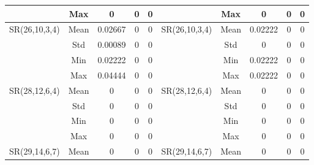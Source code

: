 \documentclass[letterpaper]{article} \usepackage{aaai24}  \usepackage{times}  \usepackage{helvet}  \usepackage{courier}  \usepackage[hyphens]{url}  \usepackage{graphicx} \urlstyle{rm} \def\UrlFont{\rm}  \usepackage{natbib}  \usepackage{caption} \frenchspacing  \setlength{\pdfpagewidth}{8.5in} \setlength{\pdfpageheight}{11in} \usepackage{algorithm}
\begin{document}
\begin{table*}[t]
{\begin{tabular}{@{}ccccc|ccccc@{}}
\multicolumn{1}{c|}{}                               & \multicolumn{1}{c|}{Max}  & 0         & 0         & 0        & \multicolumn{1}{c|}{}                               & \multicolumn{1}{c|}{Max}  & 0         & 0         & 0        \\ \midrule
\multicolumn{1}{c|}{\multirow{4}{*}{SR(26,10,3,4)}} & \multicolumn{1}{c|}{Mean} & 0.02667   & 0         & 0        & \multicolumn{1}{c|}{\multirow{4}{*}{SR(26,10,3,4)}} & \multicolumn{1}{c|}{Mean} & 0.02222   & 0         & 0        \\
\multicolumn{1}{c|}{}                               & \multicolumn{1}{c|}{Std}  & 0.00089   & 0         & 0        & \multicolumn{1}{c|}{}                               & \multicolumn{1}{c|}{Std}  & 0         & 0         & 0        \\
\multicolumn{1}{c|}{}                               & \multicolumn{1}{c|}{Min}  & 0.02222   & 0         & 0        & \multicolumn{1}{c|}{}                               & \multicolumn{1}{c|}{Min}  & 0.02222   & 0         & 0        \\
\multicolumn{1}{c|}{}                               & \multicolumn{1}{c|}{Max}  & 0.04444   & 0         & 0        & \multicolumn{1}{c|}{}                               & \multicolumn{1}{c|}{Max}  & 0.02222   & 0         & 0        \\ \midrule
\multicolumn{1}{c|}{\multirow{4}{*}{SR(28,12,6,4)}} & \multicolumn{1}{c|}{Mean} & 0         & 0         & 0        & \multicolumn{1}{c|}{\multirow{4}{*}{SR(28,12,6,4)}} & \multicolumn{1}{c|}{Mean} & 0         & 0         & 0        \\
\multicolumn{1}{c|}{}                               & \multicolumn{1}{c|}{Std}  & 0         & 0         & 0        & \multicolumn{1}{c|}{}                               & \multicolumn{1}{c|}{Std}  & 0         & 0         & 0        \\
\multicolumn{1}{c|}{}                               & \multicolumn{1}{c|}{Min}  & 0         & 0         & 0        & \multicolumn{1}{c|}{}                               & \multicolumn{1}{c|}{Min}  & 0         & 0         & 0        \\
\multicolumn{1}{c|}{}                               & \multicolumn{1}{c|}{Max}  & 0         & 0         & 0        & \multicolumn{1}{c|}{}                               & \multicolumn{1}{c|}{Max}  & 0         & 0         & 0        \\ \midrule
\multicolumn{1}{c|}{\multirow{4}{*}{SR(29,14,6,7)}} & \multicolumn{1}{c|}{Mean} & 0         & 0         & 0        & \multicolumn{1}{c|}{\multirow{4}{*}{SR(29,14,6,7)}} & \multicolumn{1}{c|}{Mean} & 0         & 0         & 0        \\

\end{tabular}}
\end{table*}
\end{document}
